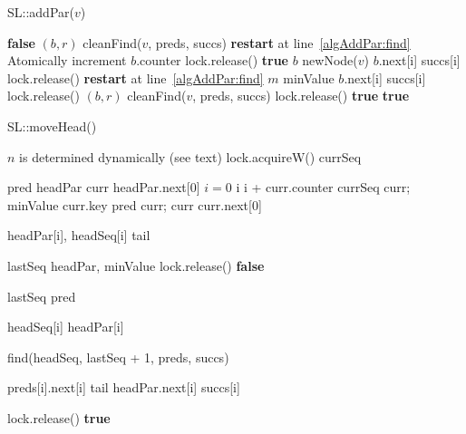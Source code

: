 \begin{algorithm}[!htb]
	\caption{SL::addPar($v$)}
	\label{alg:AddPar}
	\begin{algorithmic}[1]
		\State \Return \textbf{false}
		\EndIf
		\State $(b,r)$ \attr cleanFind($v$, preds, succs) \label{algAddPar:find}
		\State \textbf{restart} at line~\ref{algAddPar:find}
		\EndIf
		 \label{algAddPar:incblock}
		\State Atomically increment $b$.counter
		\State lock.release()
		\State \Return \textbf{true}
		\EndIf
		\State $b$ \attr newNode($v$)
		\State $b$.next[i] \attr succs[i]
		\EndFor
		\State lock.release()
		\State \textbf{restart} at line~\ref{algAddPar:find}
		\EndIf
		\Repeat
		\State $m$ \attr minValue
		\State $b$.next[i] \attr succs[i]
		\State \Continue
		\EndIf
		\State lock.release()
		\Repeat
		\State $(b,r)$ \attr cleanFind($v$, preds, succs)
		\State lock.release()
		\State \Return \textbf{true}
		\EndIf
		\EndFor
		\State \Return \textbf{true}
	\end{algorithmic}
\end{algorithm}

\begin{algorithm}[!htb]
	\caption{SL::moveHead()}
	\label{alg:MoveHead}
	\begin{algorithmic}[1]
		\State $n$ is determined dynamically (see text)
		\State lock.acquireW()
		\State currSeq \attr \nullvalue
		
		\State pred \attr headPar
		\State curr \attr headPar.next[0]
		\State $i = 0$
		 \label{algMH:consume}
		\State i \attr i + curr.counter
		\State currSeq \attr curr; minValue \attr curr.key
		\EndIf
		\State pred \attr curr; curr \attr curr.next[0]
		\EndWhile
		
		\State headPar[i], headSeq[i] \attr tail
		\EndFor
		
		\State lastSeq \attr headPar, minValue \attr \maxLvl
		\State lock.release()
		\State \Return \textbf{false}
		\EndIf
		
		\State lastSeq \attr pred
		
		 \label{algMH:copyHead}
		\State headSeq[i] \attr headPar[i]
		\EndFor
		
		\State find(headSeq, lastSeq + 1, preds, succs) \label{algMH:unlink}
		
		\State preds[i].next[i] \attr tail
		\State headPar.next[i] \attr succs[i]
		\EndFor
		
		\State lock.release()
		\State \Return \textbf{true}
	\end{algorithmic}
\end{algorithm}

